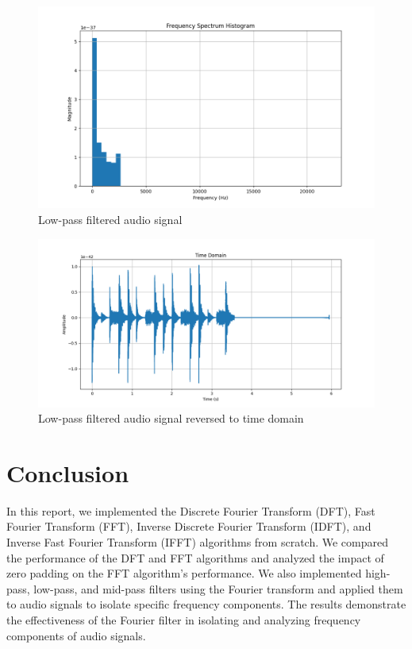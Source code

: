 \documentclass[a4paper,12pt,fleqn]{article}
\begin{document}
\begin{figure}[H]
    \centering
    \includegraphics[width=1\textwidth]{ex5_low_pass_filter.png}
    \caption{Low-pass filtered audio signal}
    \label{fig:ex5_low}
\end{figure}
\begin{figure}[H]
    \centering
    \includegraphics[width=1\textwidth]{ex5_low_pass_filter_time_domain.png}
    \caption{Low-pass filtered audio signal reversed to time domain}
    \label{fig:ex5_low_hist}
\end{figure}


\newpage

\section{Conclusion}

\hspace{1 em}In this report, we implemented the Discrete Fourier Transform (DFT), Fast Fourier Transform (FFT), Inverse Discrete Fourier Transform (IDFT), and Inverse Fast Fourier Transform (IFFT) algorithms from scratch. We compared the performance of the DFT and FFT algorithms and analyzed the impact of zero padding on the FFT algorithm's performance. We also implemented high-pass, low-pass, and mid-pass filters using the Fourier transform and applied them to audio signals to isolate specific frequency components. The results demonstrate the effectiveness of the Fourier filter in isolating and analyzing frequency components of audio signals.
\end{document}
